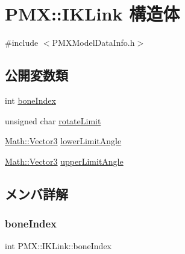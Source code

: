 \hypertarget{struct_p_m_x_1_1_i_k_link}{}\section{P\+MX\+:\+:I\+K\+Link 構造体}
\label{struct_p_m_x_1_1_i_k_link}


{\ttfamily \#include $<$P\+M\+X\+Model\+Data\+Info.\+h$>$}

\subsection*{公開変数類}
\begin{DoxyCompactItemize}
\item 
int \mbox{\hyperlink{struct_p_m_x_1_1_i_k_link_a7359e05d758a4043e0529783da08a282}{bone\+Index}}
\item 
unsigned char \mbox{\hyperlink{struct_p_m_x_1_1_i_k_link_ad4aca711c0ef48bb144f55e021e2755d}{rotate\+Limit}}
\item 
\mbox{\hyperlink{struct_math_1_1_vector3}{Math\+::\+Vector3}} \mbox{\hyperlink{struct_p_m_x_1_1_i_k_link_a518437a04175a7bc7ac713b1412ab83f}{lower\+Limit\+Angle}}
\item 
\mbox{\hyperlink{struct_math_1_1_vector3}{Math\+::\+Vector3}} \mbox{\hyperlink{struct_p_m_x_1_1_i_k_link_a250fdb6f51a1c23882b3e7b1bbbee847}{upper\+Limit\+Angle}}
\end{DoxyCompactItemize}


\subsection{メンバ詳解}
\mbox{\label{struct_p_m_x_1_1_i_k_link_a7359e05d758a4043e0529783da08a282}} 
\subsubsection{\texorpdfstring{bone\+Index}{boneIndex}}
{\footnotesize\ttfamily int P\+M\+X\+::\+I\+K\+Link\+::bone\+Index}

\mbox{\label{struct_p_m_x_1_1_i_k_link_a518437a04175a7bc7ac713b1412ab83f}} 
